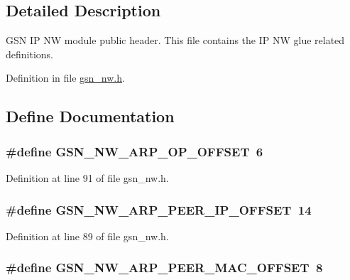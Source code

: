 \subsection{Detailed Description}
GSN IP NW module public header. This file contains the IP NW glue related definitions. 

Definition in file \hyperlink{a00532_source}{gsn\_\-nw.h}.



\subsection{Define Documentation}
\hypertarget{a00532_a3e00b78ae8a5afbd08f41fffd9acc20f}{
\subsubsection[{GSN\_\-NW\_\-ARP\_\-OP\_\-OFFSET}]{\setlength{\rightskip}{0pt plus 5cm}\#define GSN\_\-NW\_\-ARP\_\-OP\_\-OFFSET~6}}
\label{a00532_a3e00b78ae8a5afbd08f41fffd9acc20f}


Definition at line 91 of file gsn\_\-nw.h.

\hypertarget{a00532_abdfd0939d6b0f786637f26a1c943865c}{
\subsubsection[{GSN\_\-NW\_\-ARP\_\-PEER\_\-IP\_\-OFFSET}]{\setlength{\rightskip}{0pt plus 5cm}\#define GSN\_\-NW\_\-ARP\_\-PEER\_\-IP\_\-OFFSET~14}}
\label{a00532_abdfd0939d6b0f786637f26a1c943865c}


Definition at line 89 of file gsn\_\-nw.h.

\hypertarget{a00532_a9b5b58bcdadeeab74b1deef43d795355}{
\subsubsection[{GSN\_\-NW\_\-ARP\_\-PEER\_\-MAC\_\-OFFSET}]{\setlength{\rightskip}{0pt plus 5cm}\#define GSN\_\-NW\_\-ARP\_\-PEER\_\-MAC\_\-OFFSET~8}}
\label{a00532_a9b5b58bcdadeeab74b1deef43d795355}


